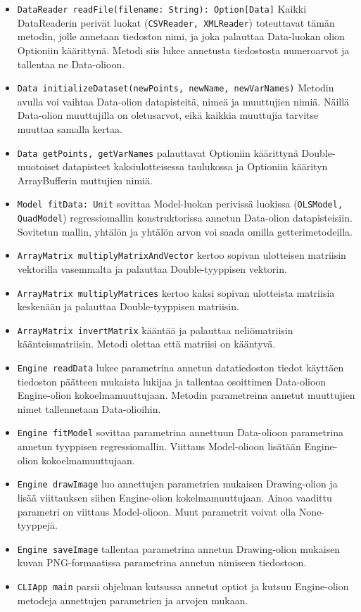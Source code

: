 \documentclass{article}
\begin{document}
    \begin{itemize}
        \item \texttt{DataReader readFile(filename: String): Option[Data]} Kaikki 
		DataReaderin perivät luokat (\texttt{CSVReader, XMLReader}) toteuttavat tämän 
		metodin, jolle annetaan tiedoston nimi, ja joka palauttaa Data-luokan olion 
		Optioniin käärittynä. Metodi siis lukee annetusta tiedostosta numeroarvot ja 
		tallentaa ne Data-olioon.
        \item \texttt{Data initializeDataset(newPoints, newName, newVarNames)} Metodin 
		avulla voi vaihtaa Data-olion datapisteitä, nimeä ja muuttujien nimiä. Näillä 
		Data-olion muuttujilla on oletusarvot, eikä kaikkia muuttujia tarvitse muuttaa 
		samalla kertaa. 
        \item \texttt{Data getPoints, getVarNames} palauttavat Optioniin käärittynä 
		Double-muotoiset datapisteet kaksiulotteisessa taulukossa ja Optioniin käärityn 
		ArrayBufferin muttujien nimiä.
        \item \texttt{Model fitData: Unit} sovittaa Model-luokan perivissä luokissa 
		(\texttt{OLSModel, QuadModel}) regressiomallin konstruktorissa annetun Data-olion 
		datapisteisiin. Sovitetun mallin, yhtälön ja yhtälön arvon voi saada omilla 
		getterimetodeilla.
		\item \texttt{ArrayMatrix multiplyMatrixAndVector} kertoo sopivan ulotteisen
		matriisin vektorilla vasemmalta ja palauttaa Double-tyyppisen vektorin.
		\item \texttt{ArrayMatrix multiplyMatrices} kertoo kaksi sopivan ulotteista
		matriisia keskenään ja palauttaa Double-tyyppisen matriisin.
		\item \texttt{ArrayMatrix invertMatrix} kääntää ja palauttaa neliömatriisin
		käänteismatriisin. Metodi olettaa että matriisi on kääntyvä.
		\item \texttt{Engine readData} lukee parametrina annetun datatiedoston tiedot
		käyttäen tiedoston päätteen mukaista lukijaa ja tallentaa osoittimen Data-olioon
		Engine-olion kokoelmamuuttujaan. Metodin parametreina annetut muuttujien nimet tallennetaan
		Data-olioihin.
		\item \texttt{Engine fitModel} sovittaa parametrina annettuun Data-olioon parametrina
		annetun tyyppisen regressiomallin. Viittaus Model-olioon lisätään Engine-olion
		kokoelmamuuttujaan.
		\item \texttt{Engine drawImage} luo annettujen parametrien mukaisen Drawing-olion
		ja lisää viittauksen siihen Engine-olion kokelmamuuttujaan. Ainoa vaadittu parametri
		on viittaus Model-olioon. Muut parametrit voivat olla None-tyyppejä.
		\item \texttt{Engine saveImage} tallentaa parametrina annetun Drawing-olion mukaisen
		kuvan PNG-formaatissa parametrina annetun nimiseen tiedostoon.
		\item \texttt{CLIApp main} parsii ohjelman kutsussa annetut optiot ja kutsuu Engine-olion
		metodeja annettujen parametrien ja arvojen mukaan.
		
    \end{itemize}
    
\end{document}
